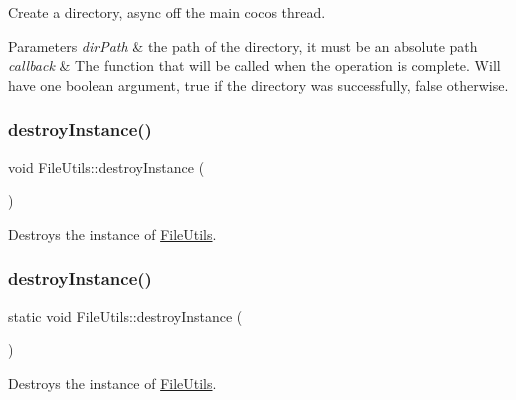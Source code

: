 Create a directory, async off the main cocos thread.


\begin{DoxyParams}{Parameters}
{\em dir\+Path} & the path of the directory, it must be an absolute path \\
\hline
{\em callback} & The function that will be called when the operation is complete. Will have one boolean argument, true if the directory was successfully, false otherwise. \\
\hline
\end{DoxyParams}
\mbox{\label{classFileUtils_abc5586f1eccca854b227e3cd8738cefd}} 
\subsubsection{\texorpdfstring{destroy\+Instance()}{destroyInstance()}\hspace{0.1cm}{\footnotesize\ttfamily [1/2]}}
{\footnotesize\ttfamily void File\+Utils\+::destroy\+Instance (\begin{DoxyParamCaption}{ }\end{DoxyParamCaption})\hspace{0.3cm}{\ttfamily [static]}}

Destroys the instance of \hyperlink{classFileUtils}{File\+Utils}. \mbox{\label{classFileUtils_a16799eaacfe932e8025d77c59080a4a2}} 
\subsubsection{\texorpdfstring{destroy\+Instance()}{destroyInstance()}\hspace{0.1cm}{\footnotesize\ttfamily [2/2]}}
{\footnotesize\ttfamily static void File\+Utils\+::destroy\+Instance (\begin{DoxyParamCaption}{ }\end{DoxyParamCaption})\hspace{0.3cm}{\ttfamily [static]}}

Destroys the instance of \hyperlink{classFileUtils}{File\+Utils}. \mbox{\label{classFileUtils_a40bea93fd4b0929153b448c345dfcf8c}} 
